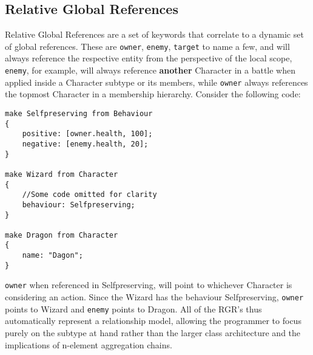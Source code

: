 \subsection{Relative Global References}
\label{relative}
Relative Global References are a set of keywords that correlate to a dynamic set of global references. These are \texttt{owner}, \texttt{enemy}, \texttt{target} to name a few, and will always reference the respective entity from the perspective of the local scope, \texttt{enemy}, for example, will always reference \textbf{another} Character in a battle when applied inside a Character subtype or its members, while \texttt{owner} always references the topmost Character in a membership hierarchy. Consider the following code:

\begin{lstlisting}[language=fflang]
make Selfpreserving from Behaviour
{
	positive: [owner.health, 100];
	negative: [enemy.health, 20];
}

make Wizard from Character
{
	//Some code omitted for clarity
	behaviour: Selfpreserving;
}

make Dragon from Character
{
	name: "Dagon";
}
\end{lstlisting}

\texttt{owner} when referenced in Selfpreserving, will point to whichever Character is considering an action. Since the Wizard has the behaviour Selfpreserving, \texttt{owner} points to Wizard and \texttt{enemy} points to Dragon. All of the RGR's thus automatically represent a relationship model, allowing the programmer to focus purely on the subtype at hand rather than the larger class architecture and the implications of n-element aggregation chains.

